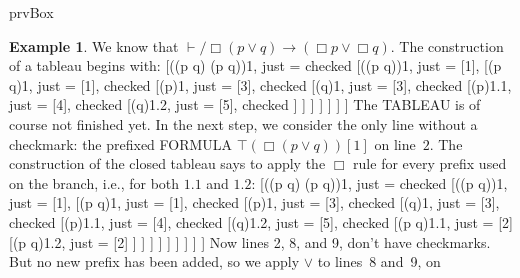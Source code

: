\documentclass[10pt,a4paper]{article}
\newcommand*{\olup}[1]{\MakeUppercase{#1}}
\theoremstyle{plain}
\theoremstyle{definition}
\newtheorem{ex}[thm]{Example}
\theoremstyle{remark}
\newenvironment{oltableau}{}{}
\providecommand{\lif}{\mathbin{\rightarrow}}
\providecommand{\Proves}{\mathrel{\vdash}}
\providecommand{\sFmla}[2]{#1(#2)}
\providecommand{\pFmla}[2]{#1(#2)}
\providecommand{\True}{\top}
\providecommand{\False}{\bot}
\providecommand{\iftag}[1]{#1}
\providecommand{\TAss}[1]{}
\providecommand{\TRule}[1]{}
\providecommand{\iftag}{}
\begin{document}
\iftag{prvBox}{
\begin{ex}
  We know that $\Proves/ \Box(p \lor q) \lif (\Box p \lor \Box
  q)$. The construction of a tableau begins with:
  \begin{oltableau}
    [\pFmla{\False}{\Box(p \lor q) \lif (\Box p \lor \Box q)}{1},
      just = \TAss, checked
      [\pFmla{\True}{\Box(p \lor q)}{1},
        just = {\TRule{\False}{\lif}[1]}, 
        [\pFmla{\False}{\Box p \lor \Box q}{1},
          just = {\TRule{\False}{\lif}[1]}, checked
          [\pFmla{\False}{\Box p}{1},
            just = {\TRule{\False}{\lor}[3]}, checked
            [\pFmla{\False}{\Box q}{1},
              just = {\TRule{\False}{\lor}[3]}, checked
              [\pFmla{\False}{p}{1.1}, 
                just = {\TRule{\False}{\Box}[4]}, checked
                [\pFmla{\False}{q}{1.2}, 
                  just = {\TRule{\False}{\Box}[5]}, checked
                ]
              ]
            ]
          ]
        ]
      ]
    ]
  \end{oltableau}
  The \olup{tableau} is of course not finished yet. In the next step, we
  consider the only line without a checkmark: the prefixed \olup{formula}
  $\sFmla{\True}{\Box(p \lor q)}[1]$ on line~$2$. The construction of
  the closed tableau says to apply the $\TRule{\True}{\Box}$ rule for
  every prefix used on the branch, i.e., for both $1.1$ and $1.2$:
  \begin{oltableau}
    [\pFmla{\False}{\Box(p \lor q) \lif (\Box p \lor \Box q)}{1},
      just = \TAss, checked
      [\pFmla{\True}{\Box(p \lor q)}{1},
        just = {\TRule{\False}{\lif}[1]}, 
        [\pFmla{\False}{\Box p \lor \Box q}{1},
          just = {\TRule{\False}{\lif}[1]}, checked
          [\pFmla{\False}{\Box p}{1},
            just = {\TRule{\False}{\lor}[3]}, checked
            [\pFmla{\False}{\Box q}{1},
              just = {\TRule{\False}{\lor}[3]}, checked
              [\pFmla{\False}{p}{1.1}, 
                just = {\TRule{\False}{\Box}[4]}, checked
                [\pFmla{\False}{q}{1.2}, 
                  just = {\TRule{\False}{\Box}[5]}, checked
                  [\pFmla{\True}{p \lor q}{1.1}, 
                    just = {\TRule{\True}{\Box}[2]}
                    [\pFmla{\True}{p \lor q}{1.2}, 
                      just = {\TRule{\True}{\Box}[2]}
                    ]
                  ]
                ]
              ]
            ]
          ]
        ]
      ]
    ]
  \end{oltableau}
  Now lines 2, 8, and 9, don't have checkmarks. But no new prefix has
  been added, so we apply $\TRule{\True}{\lor}$ to lines~8 and~9, on

\end{ex}}
\end{document}
